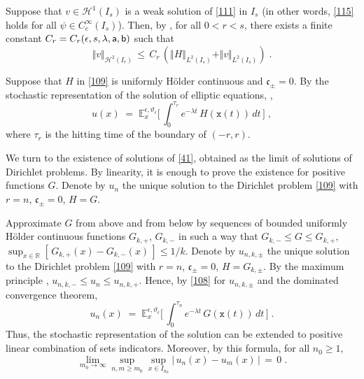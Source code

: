 \documentclass[reqno]{amsart}
\theoremstyle{plain}
\theoremstyle{definition}
\newcommand{\mc}[1]{{\mathcal #1}}
\newcommand{\mf}[1]{{\mathfrak #1}}
\newcommand{\bb}[1]{{\mathbb #1}}
\newcommand{\mss}[1]{{\textsf #1}}
\newcommand{\mtt}[1]{{\mathtt #1}}
\newcounter{as}[section]
\newcommand{\<}{\langle}
\renewcommand{\>}{\rangle}
\begin{document}
Suppose that $v\in \mc H^1(I_s)$ is a weak solution of \eqref{111} in
$I_s$ (in other words, \eqref{115} holds for all
$\psi \in C_c^{\infty}(I_s)$). Then, by \cite[Theorem 6.3.1]{le}, for
all $0<r< s$, there exists a finite constant
$C_r = C_r (\epsilon, s, \lambda, \mss a, \mss b)$ such that
\begin{equation}
\label{110}
\Vert v \Vert_{\mc H^2(I_r)} \,\le\,
C_r\, (\Vert H \Vert_{L^2(I_s)} + \Vert v\Vert_{L^2(I_s)})\;.
\end{equation}

Suppose that $H$ in \eqref{109} is uniformly H\"older continuous and
$\mf c_\pm =0$. By the stochastic representation of the solution of
elliptic equations, \cite[Theorem 6.5.1]{Fri},
\begin{equation}
\label{108}
u(x) \;=\;
\bb E^{\epsilon, \vartheta_\epsilon}_x\Big[ \, \int_0^{\tau_r}
e^{-\lambda t}\, H( \mtt x(t))\,dt\, \Big] \;,
\end{equation}
where $\tau_r$ is the hitting time of the boundary of
$(-r,r)$. \smallskip 

We turn to the existence of solutions of \eqref{41}, obtained as the
limit of solutions of Dirichlet problems. By linearity, it is enough
to prove the existence for positive functions $G$.  Denote by $u_n$
the unique solution to the Dirichlet problem \eqref{109} with $r=n$,
$\mf c_\pm =0$, $H=G$.

Approximate $G$ from above and from below by sequences of bounded
uniformly H\"older continuous functions $G_{k,+}$, $G_{k,-}$ in such a
way that $G_{k,-} \le G \le G_{k,+}$,
$\sup_{x\in \bb R} [\, G_{k,+} (x) - G_{k,-} (x) \,] \le 1/k$.  Denote
by $u_{n,k,\pm}$ the unique solution to the Dirichlet problem
\eqref{109} with $r=n$, $\mf c_\pm =0$, $H=G_{k,\pm}$.  By the maximum
principle \cite[Theorem 8.1]{GT}, $u_{n,k,-} \le u_{n} \le
u_{n,k,+}$. Hence, by \eqref{108} for $u_{n,k,\pm}$ and the dominated
convergence theorem,
\begin{equation}
\label{108b}
u_n(x) \;=\;
\bb E^{\epsilon, \vartheta_\epsilon}_x\Big[ \, \int_0^{\tau_n}
e^{-\lambda t}\, G( \mtt x(t))\,dt\, \Big] \;.
\end{equation}
Thus, the stochastic representation of the solution can be extended to
positive linear combination of sets indicators. Moreover, by this
formula, for all $n_0\ge 1$,
\begin{equation}
\label{116}
\lim_{m_0\to\infty}
\sup_{n,m\ge m_0} \sup_{x\in I_{n_0}} \big|\, u_n(x) - u_m(x)\,\big|
\,=\, 0\;.
\end{equation}
\end{document}
